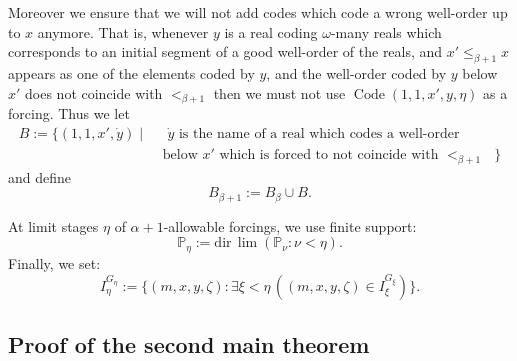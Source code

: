\documentclass[a4paper,11pt]{article}
\newcommand{\forceP}{\mathbb{P}}
\begin{document}
\begin{enumerate}
Moreover we ensure that we will not add codes which code a wrong well-order up to $x$ anymore. That is, whenever $y$ is a real coding $\omega$-many reals which corresponds to an initial segment of a good well-order of the reals, and $x' \le_{\beta+1} x$ appears as one of the elements coded by $y$, and the well-order coded by $y$ below $x'$ does not coincide with $<_{\beta+1}$ then we must not use $\operatorname{Code} (1,1,x',y,\eta)$ as a forcing. Thus we let 
\begin{align*}
B:= \{ (1,1,x',\dot{y}) \mid &\text{ $\dot{y}$ is the name of a real which codes a well-order} \\& \text{ below $x'$ which is forced to  not coincide with $<_{\beta+1}$ } \}
\end{align*}
\[  \]
and define
\[B_{\beta+1} := B_{\beta} \cup  B. \]

At limit stages \( \eta \) of \( \alpha + 1 \)-allowable forcings, we use finite support:
\[
\forceP_{\eta} := \text{dir} \, \lim (\forceP_{\nu} : \nu < \eta).
\]
Finally, we set:
\[
I_{\eta}^{G_{\eta}} := \{ (m, x, y, \zeta) : \exists \xi < \eta \, ((m, x, y, \zeta) \in I_{\xi}^{G_{\xi}}) \}.
\]
\end{enumerate}

\subsection{Proof of the second main theorem}
\end{document}
